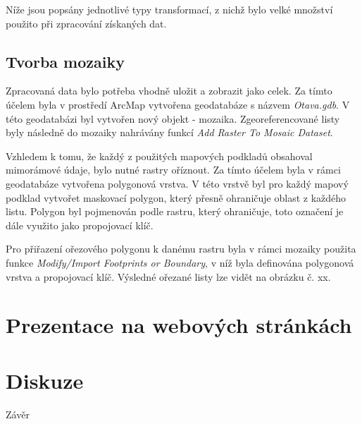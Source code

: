 \documentclass[thesis=M,czech]{FITthesis}[2012/06/26]
\begin{document}
Níže jsou popsány jednotlivé typy transformací, z nichž bylo velké množství použito při zpracování získaných dat. 



\section{Tvorba mozaiky}
Zpracovaná data bylo potřeba vhodně uložit a zobrazit jako celek. Za tímto účelem byla v prostředí ArcMap vytvořena geodatabáze s názvem \textit{Otava.gdb}. V této geodatabázi byl vytvořen nový objekt - mozaika. Zgeoreferencované listy byly následně do mozaiky nahrávány funkcí \textit{Add Raster To Mosaic Dataset}.

Vzhledem k tomu, že každý z použitých mapových podkladů obsahoval mimorámové údaje, bylo nutné rastry oříznout. Za tímto účelem byla v rámci geodatabáze vytvořena polygonová vrstva. V této vrstvě byl pro každý mapový podklad vytvořet maskovací polygon, který přesně ohraničuje oblast z každého listu. Polygon byl pojmenován podle rastru, který ohraničuje, toto označení je dále využito jako propojovací klíč. 

Pro přiřazení ořezového polygonu k danému rastru byla v rámci mozaiky použita funkce \textit{Modify/Import Footprints or Boundary}, v níž byla definována polygonová vrstva a propojovací klíč. Výsledné ořezané listy lze vidět na obrázku č. xx. 










\chapter{Prezentace na webových stránkách}


\chapter{Diskuze}



\begin{conclusion}
Závěr
\end{conclusion}




\appendix
\end{document}
